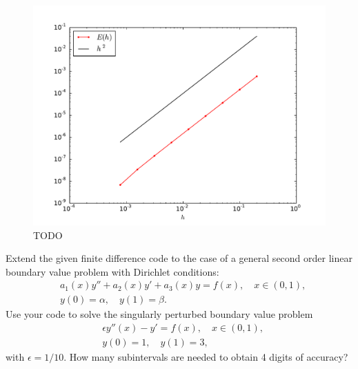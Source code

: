 % 

\begin{figure}[ht]
\centering
\includegraphics[width=12cm]{example_convergence.pdf}
\caption{TODO}
\label{figure1}
\end{figure}


\begin{problem}
Extend the given finite difference code to the case of a general second order linear boundary value problem with Dirichlet conditions:
\begin{align*}
	&{ } a_1(x)y'' +a_2(x)y'+ a_3(x) y = f(x), \quad x \in (0,1),\\
	&{ } y(0) = \alpha, \quad y(1) = \beta.
\end{align*}
Use your code to solve the singularly perturbed boundary value problem
\begin{align*}
	&{ } \epsilon y''(x)-y'= f(x), \quad x \in (0,1), \\
	&{ } y(0) = 1, \quad y(1) = 3,
\end{align*}
with $\epsilon = 1/10$. How many subintervals are needed to obtain 4 digits of accuracy? 

\end{problem}

